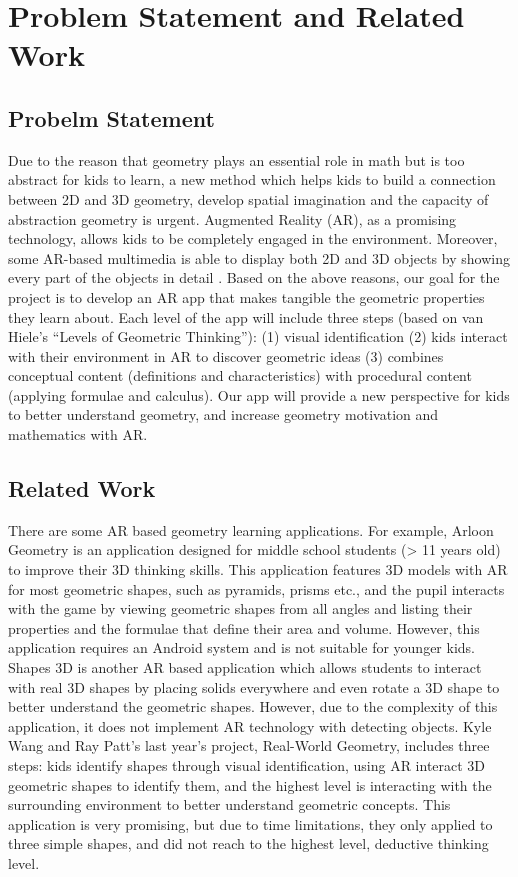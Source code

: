 \documentclass[manuscript, nonacm]{acmart}
\begin{document}
\section{Problem Statement and Related Work}

\subsection{Probelm Statement}

Due to the reason that geometry plays an essential role in math but is too
abstract for kids to learn, a new method which helps kids to build a connection
between 2D and 3D geometry, develop spatial imagination and the capacity of
abstraction geometry is urgent. Augmented Reality (AR), as a promising
technology, allows kids to be completely engaged in the environment. Moreover,
some AR-based multimedia is able to display both 2D and 3D objects by showing
every part of the objects in detail \cite{use-of-geometry-media}.  Based on the
above reasons, our goal for the project is to develop an AR app that makes
tangible the geometric properties they learn about. Each level of the app will
include three steps (based on van Hiele’s “Levels of Geometric Thinking”): (1)
visual identification (2) kids interact with their environment in AR to discover
geometric ideas (3) combines conceptual content (definitions and
characteristics) with procedural content (applying formulae and calculus). Our
app will provide a new perspective for kids to better understand geometry, and
increase geometry motivation and mathematics with AR.

\subsection{Related Work}

There are some AR based geometry learning applications. For example, Arloon
Geometry is an application designed for middle school students (> 11 years old)
to improve their 3D thinking skills. This application features 3D models with AR
for most geometric shapes, such as pyramids, prisms etc., and the pupil
interacts with the game by viewing geometric shapes from all angles and listing
their properties and the formulae that define their area and volume. However,
this application requires an Android system and is not suitable for younger
kids. Shapes 3D is another AR based application which allows students to
interact with real 3D shapes by placing solids everywhere and even rotate a 3D
shape to better understand the geometric shapes. However, due to the complexity
of this application, it does not implement AR technology with detecting
objects. Kyle Wang and Ray Patt’s last year’s project, Real-World Geometry,
includes three steps: kids identify shapes through visual identification, using
AR interact 3D geometric shapes to identify them, and the highest level is
interacting with the surrounding environment to better understand geometric
concepts. This application is very promising, but due to time limitations, they
only applied to three simple shapes, and did not reach to the highest level,
deductive thinking level.
\end{document}

